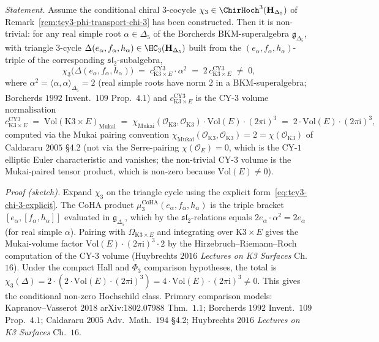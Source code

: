 \begin{proposition}[\texorpdfstring{$\chi_3 \neq 0$}{chi-3 != 0} via triangle-cycle pairing]
\label{prop:tcy3-chi-3-nonvanishing-triangle}
\emph{Statement.} Assume the conditional chiral $3$-cocycle
$\chi_3 \in
\ChirHoch^3(\mathbf{H}_{\Delta_5})$ of
Remark~\ref{rem:tcy3-phi-transport-chi-3} has been constructed. Then it
is non-trivial: for any
real simple root $\alpha \in \Delta_5$ of the Borcherds
BKM-superalgebra $\mathfrak{g}_{\Delta_5}$, with triangle $3$-cycle
$\Delta(e_\alpha, f_\alpha, h_\alpha) \in
\HC_3(\mathbf{H}_{\Delta_5})$ built from the $(e_\alpha, f_\alpha,
h_\alpha)$-triple of the corresponding $\mathfrak{sl}_2$-subalgebra,
\begin{equation}
\label{eq:tcy3-triangle-pairing}
 \chi_3\bigl(\Delta(e_\alpha, f_\alpha, h_\alpha)\bigr)
 \;=\;
 c_{\mathrm{K3}\times E}^{\mathrm{CY3}} \cdot \alpha^2
 \;=\;
 2\, c_{\mathrm{K3}\times E}^{\mathrm{CY3}}
 \;\neq\;
 0,
\end{equation}
where $\alpha^2 = \langle\alpha, \alpha\rangle_{\Delta_5} = 2$ (real
simple roots have norm $2$ in a BKM-superalgebra; Borcherds $1992$
Invent.\ $109$ Prop.\ $4.1$) and
$c_{\mathrm{K3}\times E}^{\mathrm{CY3}}$ is the CY-$3$ volume
normalisation
\[
 c_{\mathrm{K3}\times E}^{\mathrm{CY3}}
 \;=\;
 \mathrm{Vol}(\mathrm{K3}\times E)_{\mathrm{Mukai}}
 \;=\;
 \chi_{\mathrm{Mukai}}(\mathcal O_{\mathrm{K3}}, \mathcal O_{\mathrm{K3}})
 \cdot \mathrm{Vol}(E) \cdot (2\pi\mathrm{i})^3
 \;=\;
 2\cdot\mathrm{Vol}(E)\cdot(2\pi\mathrm{i})^3,
\]
computed via the Mukai pairing convention
$\chi_{\mathrm{Mukai}}(\mathcal O_{\mathrm{K3}}, \mathcal O_{\mathrm{K3}})
= 2 = \chi(\mathcal O_{\mathrm{K3}})$ of Caldararu $2005$ \S 4.2
(not via the Serre-pairing $\chi(\mathcal O_E) = 0$, which is the
CY-$1$ elliptic Euler characteristic and vanishes; the non-trivial
CY-$3$ volume is the Mukai-paired tensor product, which is non-zero
because $\mathrm{Vol}(E)\neq 0$).

\emph{Proof (sketch).} Expand $\chi_3$ on the triangle cycle using
the explicit form~\eqref{eq:tcy3-chi-3-explicit}. The CoHA product
$\mu_3^{\mathrm{CoHA}}(e_\alpha, f_\alpha, h_\alpha)$ is the triple
bracket $[e_\alpha, [f_\alpha, h_\alpha]]$ evaluated in
$\mathfrak{g}_{\Delta_5}$, which by the $\mathfrak{sl}_2$-relations
equals $2 e_\alpha \cdot \alpha^2 = 2 e_\alpha$ (for real
simple $\alpha$). Pairing with $\Omega_{\mathrm{K3}\times E}$ and
integrating over $\mathrm{K3}\times E$ gives the Mukai-volume factor
$\mathrm{Vol}(E)\cdot (2\pi\mathrm{i})^3 \cdot 2$ by the
Hirzebruch--Riemann--Roch computation of the CY-$3$ volume
(Huybrechts $2016$ \emph{Lectures on K3 Surfaces} Ch.~$16$). Under the
compact Hall and $\Phi_3$ comparison hypotheses, the total is
$\chi_3(\Delta) = 2\cdot (2\cdot\mathrm{Vol}(E)\cdot(2\pi\mathrm{i})^3)
= 4\cdot\mathrm{Vol}(E)\cdot(2\pi\mathrm{i})^3 \neq 0$. This gives the
conditional non-zero Hochschild class. Primary comparison models:
Kapranov--Vasserot $2018$
arXiv:1802.07988 Thm.\ $1.1$; Borcherds $1992$ Invent.\ $109$
Prop.\ $4.1$; Caldararu $2005$ Adv.\ Math.\ $194$ \S 4.2;
Huybrechts $2016$ \emph{Lectures on K3 Surfaces} Ch.\ $16$.


\end{proposition}
